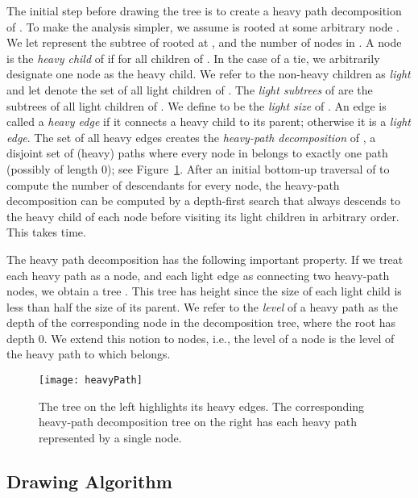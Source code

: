 \documentclass[11pt]{article}
\newcommand{\highlight}[1]{{\itshape #1}}
\begin{document}
The initial step before drawing the tree  is to create a heavy path
decomposition~\cite{ht-fafnc-84} of .  To make the analysis
simpler, we assume  is rooted at some arbitrary node .  We let
 represent the subtree of  rooted at , and  the
number of nodes in . A node  is the \highlight{heavy child} of
 if  for all children  of .  In the case of
a tie, we arbitrarily designate one node as the heavy child.  We refer
to the non-heavy children as \highlight{light} and let  denote
the set of all light children of .  The \highlight{light subtrees}
of  are the subtrees of all light children of . We define  to be the \highlight{light size} of
. An edge is called a \highlight{heavy edge} if it connects a heavy
child to its parent; otherwise it is a \highlight{light edge}. The set
of all heavy edges creates the \highlight{heavy-path decomposition} of
, a disjoint set of (heavy) paths where every node in  belongs
to exactly one path (possibly of length 0); see Figure~\ref{fig:heavyPath}. 
After an initial bottom-up traversal of  to compute the number of descendants for every node, the heavy-path decomposition can be computed by a depth-first search that always descends to the heavy child of each node before visiting its light children in arbitrary order. 
This takes  time.

The heavy path
decomposition has the following important property.  If we treat
each heavy path as a node, and each light edge as connecting two
heavy-path nodes, we obtain a tree . This tree has height  since the size of each light child is less than half the
size of its parent. We refer to the \highlight{level} of a heavy path
as the depth of the corresponding node in the decomposition tree,
where the root has depth 0. We extend this notion to nodes, i.e., the
level of a node  is the level of the heavy path to which 
belongs.
  \begin{figure}[tb]
    \begin{center}
      \texttt{[image: heavyPath]}
    \end{center}
    \caption{The tree  on the left highlights its heavy edges. The
      corresponding heavy-path decomposition tree  on the right has each
      heavy path represented by a single node.}
    \label{fig:heavyPath}
  \end{figure}


\subsection{Drawing Algorithm}
\label{sec:drawalg}
\end{document}
